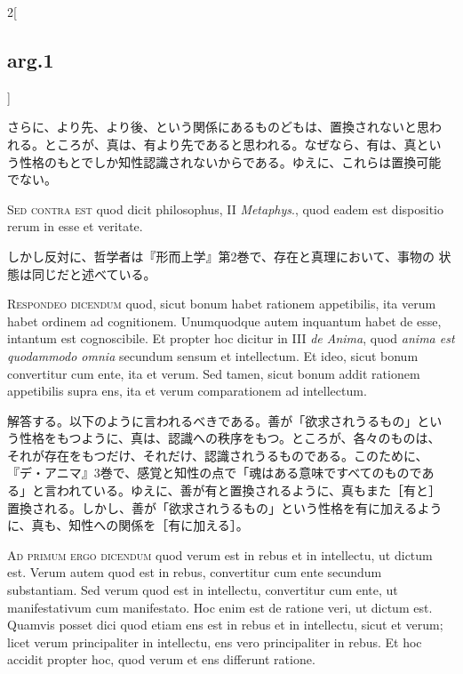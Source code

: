 \documentclass[paper=a4paper,fontsize=10pt,jafontsize=9pt,titlepage]{jlreq}
\begin{document}
\begin{paracol}{2}[\subsection{arg.1}]
\switchcolumn

さらに、より先、より後、という関係にあるものどもは、置換されないと思わ
れる。ところが、真は、有より先であると思われる。なぜなら、有は、真とい
う性格のもとでしか知性認識されないからである。ゆえに、これらは置換可能
でない。

\switchcolumn*[\subsection{s.c.}]


{\scshape Sed contra est} quod dicit philosophus, II {\itshape
 Metaphys}., quod eadem est dispositio rerum in esse et veritate.

\switchcolumn

しかし反対に、哲学者は『形而上学』第2巻で、存在と真理において、事物の
状態は同じだと述べている。



{\scshape Respondeo dicendum} quod, sicut bonum habet rationem
 appetibilis, ita verum habet ordinem ad cognitionem. Unumquodque
 autem inquantum habet de esse, intantum est cognoscibile. Et propter
 hoc dicitur in III {\itshape de Anima}, quod {\itshape anima est
 quodammodo omnia} secundum sensum et intellectum. Et ideo, sicut
 bonum convertitur cum ente, ita et verum. Sed tamen, sicut bonum
 addit rationem appetibilis supra ens, ita et verum comparationem ad
 intellectum.

\switchcolumn

解答する。以下のように言われるべきである。善が「欲求されうるもの」とい
う性格をもつように、真は、認識への秩序をもつ。ところが、各々のものは、
それが存在をもつだけ、それだけ、認識されうるものである。このために、
『デ・アニマ』3巻で、感覚と知性の点で「魂はある意味ですべてのものであ
る」と言われている。ゆえに、善が有と置換されるように、真もまた［有と］
置換される。しかし、善が「欲求されうるもの」という性格を有に加えるよう
に、真も、知性への関係を［有に加える］。

\switchcolumn*[\subsection{ad.1}]


{\scshape Ad primum ergo dicendum} quod verum est in rebus et in
intellectu, ut dictum est. Verum autem quod est in rebus, convertitur
cum ente secundum substantiam. Sed verum quod est in intellectu,
convertitur cum ente, ut manifestativum cum manifestato. Hoc enim est
de ratione veri, ut dictum est. Quamvis posset dici quod etiam ens est
in rebus et in intellectu, sicut et verum; licet verum principaliter
in intellectu, ens vero principaliter in rebus. Et hoc accidit propter
hoc, quod verum et ens differunt ratione.


\end{paracol}
\end{document}
